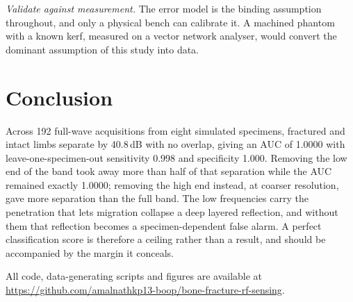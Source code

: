 \documentclass[conference]{IEEEtran}
\begin{document}
\emph{Validate against measurement.} The error model is the binding
assumption throughout, and only a physical bench can calibrate it. A
machined phantom with a known kerf, measured on a vector network analyser,
would convert the dominant assumption of this study into data.

\section{Conclusion}

Across 192 full-wave acquisitions from eight simulated specimens, fractured
and intact limbs separate by 40.8\,dB with no overlap, giving an AUC of
1.0000 with leave-one-specimen-out sensitivity 0.998 and specificity 1.000.
Removing the low end of the band took away more than half of that
separation while the AUC remained exactly 1.0000; removing the high end
instead, at coarser resolution, gave more separation than the full band.
The low frequencies carry the penetration that lets migration collapse a
deep layered reflection, and without them that reflection becomes a
specimen-dependent false alarm. A perfect classification score is therefore
a ceiling rather than a result, and should be accompanied by the margin it
conceals.

All code, data-generating scripts and figures are available at
\url{https://github.com/amalnathkp13-boop/bone-fracture-rf-sensing}.
\end{document}
